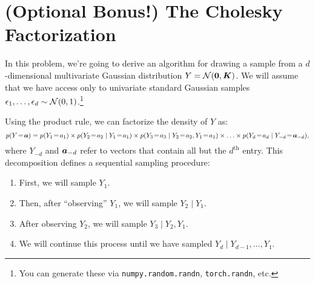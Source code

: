 \documentclass[11pt,letterpaper]{article}
\begin{document}
\section{(Optional Bonus!) The Cholesky Factorization}
In this problem, we're going to derive an algorithm for drawing a sample from a $d$-dimensional multivariate Gaussian distribution $Y = \mathcal{N}({\bm{0}}, {\bm{K}})$.
We will assume that we have access only to univariate standard Gaussian samples $\epsilon_1, \ldots, \epsilon_d \sim \mathcal{N}(0, 1)$.\footnote{
  You can generate these via {\tt numpy.random.randn}, {\tt torch.randn}, etc.
}

Using the product rule, we can factorize the density of $Y$ as:
%
$$
p(Y \!=\! \va) = p(Y_1 \!=\! a_1) \times p(Y_2 \!=\! a_2 \mid Y_1 \!=\! a_1) \times p(Y_3 \!=\! a_3 \mid Y_2\!=\!a_2, Y_1\!=\!a_1) \times \ldots \times
p(Y_d \!=\! a_d \mid Y_{-d} \!=\! \va_{-d}),
$$
%
where $Y_{-d}$ and ${\bm{a}}_{-d}$ refer to vectors that contain all but the $d^\mathrm{th}$ entry.
This decomposition defines a sequential sampling procedure:
\begin{enumerate}
  \item First, we will sample $Y_1$.
  \item Then, after ``observing'' $Y_1$, we will sample $Y_2 \mid Y_1$.
  \item After observing $Y_2$, we will sample $Y_3 \mid Y_2, Y_1$.
  \item We will continue this process until we have sampled $Y_d \mid Y_{d-1}, \ldots, Y_1$.
\end{enumerate}
\end{document}
